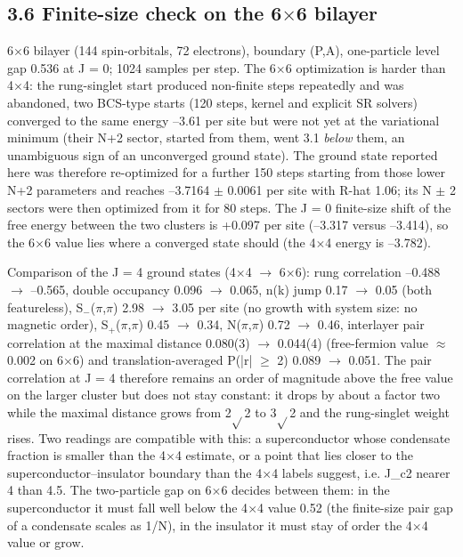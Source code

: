 \documentclass[10pt]{article}
\begin{document}
\subsection*{3.6 Finite-size check on the 6$\times$6 bilayer}

6$\times$6 bilayer (144 spin-orbitals, 72 electrons), boundary (P,A), one-particle level gap 0.536 at J = 0; 1024 samples per step. The 6$\times$6 optimization is harder than 4$\times$4: the rung-singlet start produced non-finite steps repeatedly and was abandoned, two BCS-type starts (120 steps, kernel and explicit SR solvers) converged to the same energy --3.61 per site but were not yet at the variational minimum (their N+2 sector, started from them, went 3.1 \emph{below} them, an unambiguous sign of an unconverged ground state). The ground state reported here was therefore re-optimized for a further 150 steps starting from those lower N+2 parameters and reaches --3.7164 $\pm$ 0.0061 per site with R-hat 1.06; its N $\pm$ 2 sectors were then optimized from it for 80 steps. The J = 0 finite-size shift of the free energy between the two clusters is +0.097 per site (--3.317 versus --3.414), so the 6$\times$6 value lies where a converged state should (the 4$\times$4 energy is --3.782).

Comparison of the J = 4 ground states (4$\times$4 $\to$ 6$\times$6): rung correlation --0.488 $\to$ --0.565, double occupancy 0.096 $\to$ 0.065, n(k) jump 0.17 $\to$ 0.05 (both featureless), S$_-$($\pi$,$\pi$) 2.98 $\to$ 3.05 per site (no growth with system size: no magnetic order), S$_+$($\pi$,$\pi$) 0.45 $\to$ 0.34, N($\pi$,$\pi$) 0.72 $\to$ 0.46, interlayer pair correlation at the maximal distance 0.080(3) $\to$ 0.044(4) (free-fermion value $\approx$ 0.002 on 6$\times$6) and translation-averaged P(|r| $\ge$ 2) 0.089 $\to$ 0.051. The pair correlation at J = 4 therefore remains an order of magnitude above the free value on the larger cluster but does not stay constant: it drops by about a factor two while the maximal distance grows from 2$\sqrt{}$2 to 3$\sqrt{}$2 and the rung-singlet weight rises. Two readings are compatible with this: a superconductor whose condensate fraction is smaller than the 4$\times$4 estimate, or a point that lies closer to the superconductor--insulator boundary than the 4$\times$4 labels suggest, i.e. J\_c2 nearer 4 than 4.5. The two-particle gap on 6$\times$6 decides between them: in the superconductor it must fall well below the 4$\times$4 value 0.52 (the finite-size pair gap of a condensate scales as 1/N), in the insulator it must stay of order the 4$\times$4 value or grow.
\end{document}
